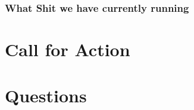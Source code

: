 \documentclass[aspectratio=169]{beamer}
\begin{document}

\begin{frame}
\frametitle{What Shit we have currently running}

\begin{tikzpicture}


\end{tikzpicture}

\end{frame}


\section{Call for Action}

\section{Questions}
\end{document}
